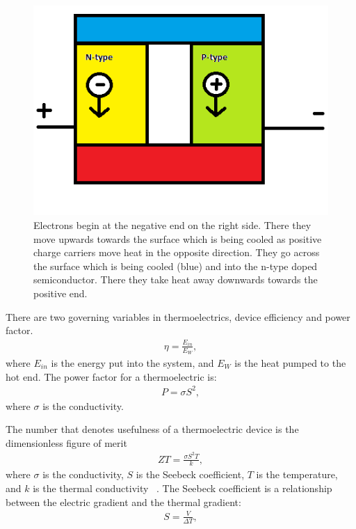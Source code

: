 \begin{figure}[htbp]
\begin{center}
\includegraphics[scale=.50]{thermoelectric.png}
\caption{Electrons begin at the negative end on the right side. There they move upwards towards the surface which is being cooled as positive charge carriers move heat in the opposite direction. They go across the surface which is being cooled (blue) and into the n-type doped semiconductor. There they take heat away downwards towards the positive end.}
\label{currentTE}
\end{center}
\end{figure}

There are two governing variables in thermoelectrics, device efficiency and power factor.
\begin{eqnarray}
\eta = \frac{E_{in}}{E_{W}},
\label{efficiency}
\end{eqnarray}
where $E_{in}$ is the energy put into the system, and $E_{W}$ is the heat pumped to the hot end. The power factor for a thermoelectric is:
\begin{eqnarray}
P = \sigma S^2,
\label{power}
\end{eqnarray}
where $\sigma$ is the conductivity.

 The number that denotes usefulness of a thermoelectric device is the dimensionless figure of merit
\begin{eqnarray}
ZT = \frac{\sigma S^2 T}{k},
\label{ZT}
\end{eqnarray}
where $\sigma$ is the conductivity, $S$ is the Seebeck coefficient, $T$ is the temperature, and $k$ is the thermal conductivity ~\cite{chen}. The Seebeck coefficient is a relationship between the electric gradient and the thermal gradient:
\begin{eqnarray}
S = \frac{V}{\Delta T},
\label{Seebeck}
\end{eqnarray}

